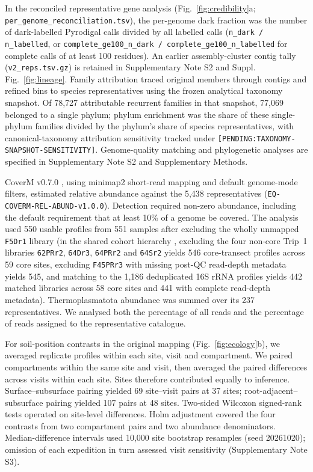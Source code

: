 \documentclass[11pt]{article}
\begin{document}
In the reconciled representative gene analysis (Fig.~\ref{fig:credibility}a; \texttt{per\_genome\_reconciliation.tsv}), the per-genome dark fraction was the number of dark-labelled Pyrodigal calls divided by all labelled calls (\texttt{n\_dark / n\_labelled}, or \texttt{complete\_ge100\_n\_dark / complete\_ge100\_n\_labelled} for complete calls of at least 100 residues). An earlier assembly-cluster contig tally (\texttt{v2\_reps.tsv.gz}) is retained in Supplementary Note S2 and Suppl. Fig.~\ref{fig:lineage}. Family attribution traced original members through contigs and refined bins to species representatives using the frozen analytical taxonomy snapshot. Of 78,727 attributable recurrent families in that snapshot, 77,069 belonged to a single phylum; phylum enrichment was the share of these single-phylum families divided by the phylum's share of species representatives, with canonical-taxonomy attribution sensitivity tracked under \texttt{[PENDING:\allowbreak TAXONOMY-\allowbreak SNAPSHOT-\allowbreak SENSITIVITY]}. Genome-quality matching and phylogenetic analyses are specified in Supplementary Note S2 and Supplementary Methods.

CoverM v0.7.0 \citep{aroney2025coverm}, using minimap2 short-read mapping and default genome-mode filters, estimated relative abundance against the 5,438 representatives (\texttt{EQ-COVERM-REL-ABUND-v1.0.0}). Detection required non-zero abundance, including the default requirement that at least 10\% of a genome be covered. The analysis used 550 usable profiles from 551 samples after excluding the wholly unmapped \texttt{F5Dr1} library (in the shared cohort hierarchy \citep{rubalkhali_datapaper}, excluding the four non-core Trip~1 libraries \texttt{62PRr2}, \texttt{64Dr3}, \texttt{64PRr2} and \texttt{64Sr2} yields 546 core-transect profiles across 59 core sites, excluding \texttt{F45PRr3} with missing post-QC read-depth metadata yields 545, and matching to the 1,186 deduplicated 16S rRNA profiles yields 442 matched libraries across 58 core sites and 441 with complete read-depth metadata). Thermoplasmatota abundance was summed over its 237 representatives. We analysed both the percentage of all reads and the percentage of reads assigned to the representative catalogue.

For soil-position contrasts in the original mapping (Fig.~\ref{fig:ecology}b), we averaged replicate profiles within each site, visit and compartment. We paired compartments within the same site and visit, then averaged the paired differences across visits within each site. Sites therefore contributed equally to inference. Surface--subsurface pairing yielded 69 site--visit pairs at 37 sites; root-adjacent--subsurface pairing yielded 107 pairs at 48 sites. Two-sided Wilcoxon signed-rank tests operated on site-level differences. Holm adjustment covered the four contrasts from two compartment pairs and two abundance denominators. Median-difference intervals used 10,000 site bootstrap resamples (seed 20261020); omission of each expedition in turn assessed visit sensitivity (Supplementary Note S3).
\end{document}
